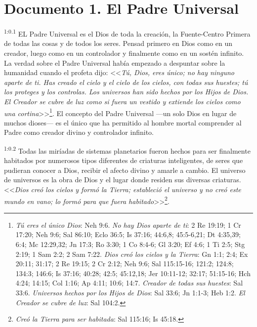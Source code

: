 \chapter{Documento 1. El Padre Universal}
\setcounter{chapter}{1}
\par
\textsuperscript{1:0.1} EL Padre Universal es el Dios de toda la creación, la Fuente-Centro Primera de todas las cosas y de todos los seres. Pensad primero en Dios como en un creador, luego como en un controlador y finalmente como en un sostén infinito. La verdad sobre el Padre Universal había empezado a despuntar sobre la humanidad cuando el profeta dijo: <<\textit{Tú, Dios, eres único; no hay ninguno aparte de ti. Has creado el cielo y el cielo de los cielos, con todas sus huestes; tú los proteges y los controlas. Los universos han sido hechos por los Hijos de Dios. El Creador se cubre de luz como si fuera un vestido y extiende los cielos como una cortina}>>\footnote{\textit{Tú eres el único Dios}: Neh 9:6. \textit{No hay Dios aparte de ti}: 2 Re 19:19; 1 Cr 17:20; Neh 9:6; Sal 86:10; Eclo 36:5; Is 37:16; 44:6,8; 45:5-6,21; Dt 4:35,39; 6:4; Mc 12:29,32; Jn 17:3; Ro 3:30; 1 Co 8:4-6; Gl 3:20; Ef 4:6; 1 Ti 2:5; Stg 2:19; 1 Sam 2:2; 2 Sam 7:22. \textit{Dios creó los cielos y la Tierra}: Gn 1:1; 2:4; Ex 20:11; 31:17; 2 Re 19:15; 2 Cr 2:12; Neh 9:6; Sal 115:15-16; 121:2; 124:8; 134:3; 146:6; Is 37:16; 40:28; 42:5; 45:12,18; Jer 10:11-12; 32:17; 51:15-16; Hch 4:24; 14:15; Col 1:16; Ap 4:11; 10:6; 14:7. \textit{Creador de todas sus huestes}: Sal 33:6. \textit{Universos hechos por los Hijos de Dios}: Sal 33:6; Jn 1:1-3; Heb 1:2. \textit{El Creador se cubre de luz}: Sal 104:2.}. El concepto del Padre Universal ---un solo Dios en lugar de muchos dioses--- es el único que ha permitido al hombre mortal comprender al Padre como creador divino y controlador infinito.

\par
\textsuperscript{1:0.2} Todas las miríadas de sistemas planetarios fueron hechos para ser finalmente habitados por numerosos tipos diferentes de criaturas inteligentes, de seres que pudieran conocer a Dios, recibir el afecto divino y amarle a cambio. El universo de universos es la obra de Dios y el lugar donde residen sus diversas criaturas. <<\textit{Dios creó los cielos y formó la Tierra; estableció el universo y no creó este mundo en vano; lo formó para que fuera habitado}>>\footnote{\textit{Creó la Tierra para ser habitada}: Sal 115:16; Is 45:18.}.

